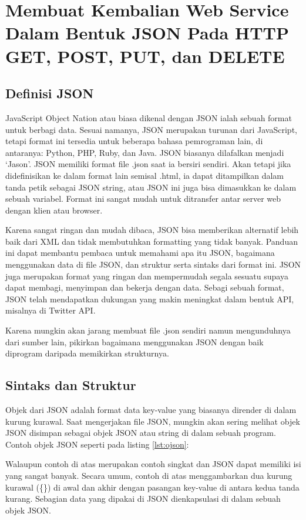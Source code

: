 \section{Membuat Kembalian Web Service Dalam Bentuk JSON Pada HTTP GET,  POST, PUT, dan DELETE}
\subsection{Definisi JSON}
JavaScript Object Nation atau biasa dikenal dengan JSON ialah sebuah format untuk berbagi data. Sesuai namanya, JSON merupakan turunan dari JavaScript, tetapi format ini tersedia untuk beberapa bahasa pemrograman lain, di antaranya: Python, PHP, Ruby, dan Java. JSON biasanya dilafalkan menjadi ‘Jason’. JSON memiliki format file .json saat ia bersiri sendiri. Akan tetapi jika didefinisikan ke dalam format lain semisal .html, ia dapat ditampilkan dalam tanda petik sebagai JSON string, atau JSON ini juga bisa dimasukkan ke dalam sebuah variabel. Format ini sangat mudah untuk ditransfer antar server web dengan klien atau browser. 

Karena sangat ringan dan mudah dibaca, JSON bisa memberikan alternatif lebih baik dari XML dan tidak membutuhkan formatting yang tidak banyak. Panduan ini dapat membantu pembaca untuk memahami apa itu JSON, bagaimana menggunakan data di file JSON, dan struktur serta sintaks dari format ini. JSON juga merupakan format yang ringan dan mempermudah segala sesuatu supaya dapat membagi, menyimpan dan bekerja dengan data. Sebagi sebuah format, JSON telah mendapatkan dukungan yang makin meningkat dalam bentuk API, misalnya di Twitter API.

Karena mungkin akan jarang membuat file .json sendiri namun mengunduhnya dari sumber lain, pikirkan bagaimana menggunakan JSON dengan baik diprogram daripada memikirkan strukturnya.

\subsection{Sintaks dan Struktur} 
Objek dari JSON adalah format data key-value yang biasanya dirender di dalam kurung kurawal. Saat mengerjakan file JSON, mungkin akan sering melihat objek JSON disimpan sebagai objek JSON atau string di dalam sebuah program.
Contoh objek JSON seperti pada listing \ref{lst:ojson}:


Walaupun contoh di atas merupakan contoh singkat dan JSON dapat memiliki isi yang sangat banyak. Secara umum, contoh di atas menggambarkan dua kurung kurawal (\{\}) di awal dan akhir dengan pasangan key-value di antara kedua tanda kurang. Sebagian data yang dipakai di JSON dienkapsulasi di dalam sebuah objek JSON.

